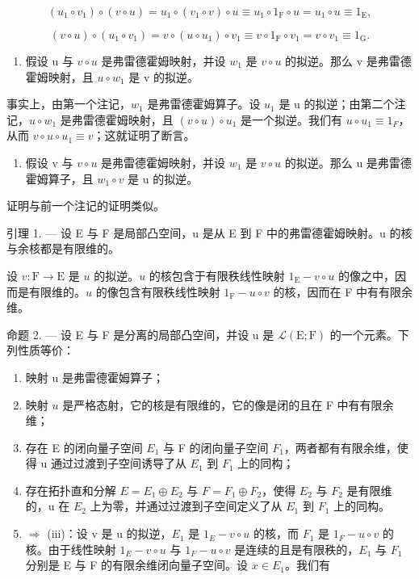 \[
\left(u _ {1} \circ v _ {1}\right) \circ (v \circ u) = u _ {1} \circ \left(v _ {1} \circ v\right) \circ u \equiv u _ {1} \circ 1 _ {\mathrm{F}} \circ u = u _ {1} \circ u \equiv 1 _ {\mathrm{E}},
\]

\[
(v \circ u) \circ (u _ {1} \circ v _ {1}) = v \circ (u \circ u _ {1}) \circ v _ {1} \equiv v \circ 1 _ {\mathrm{F}} \circ v _ {1} = v \circ v _ {1} \equiv 1 _ {\mathrm{G}}.
\]

\begin{enumerate}
\def\labelenumi{\arabic{enumi})}
\setcounter{enumi}{2}
\tightlist
\item
  假设 u 与 \(v \circ u\) 是弗雷德霍姆映射，并设 \(w_{1}\) 是 \(v \circ u\) 的拟逆。那么 v 是弗雷德霍姆映射，且 \(u \circ w_{1}\) 是 v 的拟逆。
\end{enumerate}

事实上，由第一个注记，\(w_{1}\) 是弗雷德霍姆算子。设 \(u_{1}\) 是 u 的拟逆；由第二个注记，\(u \circ w_{1}\) 是弗雷德霍姆映射，且 \((v \circ u) \circ u_{1}\) 是一个拟逆。我们有 \(u \circ u_{1} \equiv 1_{F}\)，从而 \(v \circ u \circ u_{1} \equiv v\)；这就证明了断言。

\begin{enumerate}
\def\labelenumi{\arabic{enumi})}
\setcounter{enumi}{3}
\tightlist
\item
  假设 v 与 \(v \circ u\) 是弗雷德霍姆映射，并设 \(w_{1}\) 是 \(v \circ u\) 的拟逆。那么 u 是弗雷德霍姆算子，且 \(w_{1} \circ v\) 是 u 的拟逆。
\end{enumerate}

证明与前一个注记的证明类似。

引理 1. --- 设 E 与 F 是局部凸空间，u 是从 E 到 F 中的弗雷德霍姆映射。u 的核与余核都是有限维的。

设 \(v \colon \mathrm{F} \to \mathrm{E}\) 是 \(u\) 的拟逆。\(u\) 的核包含于有限秩线性映射 \(1_{\mathrm{E}} - v \circ u\) 的像之中，因而是有限维的。\(u\) 的像包含有限秩线性映射 \(1_{\mathrm{F}} - u \circ v\) 的核，因而在 F 中有有限余维。

命题 2. — 设 E 与 F 是分离的局部凸空间，并设 u 是 \(\mathcal{L}(\mathrm{E};\mathrm{F})\) 的一个元素。下列性质等价：

\begin{enumerate}
\def\labelenumi{(\roman{enumi})}
\item
  映射 u 是弗雷德霍姆算子；
\item
  映射 \(u\) 是严格态射，它的核是有限维的，它的像是闭的且在 F 中有有限余维；
\item
  存在 E 的闭向量子空间 \(E_{1}\) 与 F 的闭向量子空间 \(F_{1}\)，两者都有有限余维，使得 u 通过过渡到子空间诱导了从 \(E_{1}\) 到 \(F_{1}\) 上的同构；
\item
   存在拓扑直和分解 \(E = E_{1} \oplus E_{2}\) 与 \(F = F_{1} \oplus F_{2}\)，使得 \(E_{2}\) 与 \(F_{2}\) 是有限维的，u 在 \(E_{2}\) 上为零，并通过过渡到子空间定义了从 \(E_{1}\) 到 \(F_{1}\) 上的同构。
\item
  \(\Longrightarrow\) (iii)：设 v 是 u 的拟逆，\(E_{1}\) 是 \(1_{E}-v\circ u\) 的核，而 \(F_{1}\) 是 \(1_{F}-u\circ v\) 的核。由于线性映射 \(1_{E}-v\circ u\) 与 \(1_{F}-u\circ v\) 是连续的且是有限秩的，\(E_{1}\) 与 \(F_{1}\) 分别是 E 与 F 的有限余维闭向量子空间。设 \(x\in E_{1}\)。我们有
\end{enumerate}

